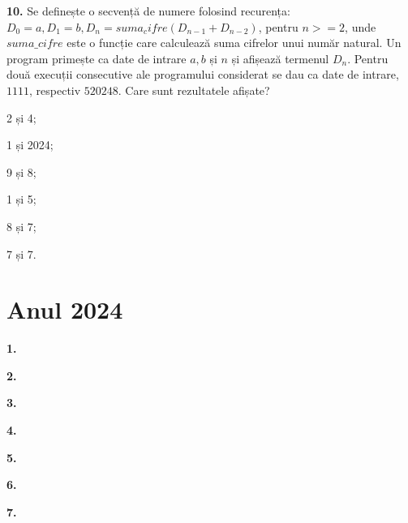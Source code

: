 \documentclass[11pt, a4paper]{article}
\begin{document}
\vspace{0.5cm}

\textbf{10.}\newline
Se definește o secvență de numere folosind recurența: $D_0=a, D_1=b, D_n=suma_cifre(D_{n-1}+D_{n-2})$, pentru $n>=2$, unde $suma\_cifre$ este o funcție care calculează suma cifrelor unui număr natural. Un program primește ca date de intrare $a, b$ și $n$ și afișează termenul $D_n$. Pentru două execuții consecutive ale programului considerat se dau ca date de intrare, $1 1 11$, respectiv $5 2024 8$. Care sunt rezultatele afișate?
\begin{inparaenum}
    \item 2 și 4;
    \item 1 și 2024;
    \item 9 și 8;
    \item 1 și 5;
    \item 8 și 7;
    \item 7 și 7.
\end{inparaenum}


\section{Anul 2024}
\textbf{1.}\newline


\vspace{0.5cm}

\textbf{2.}\newline


\vspace{0.5cm}

\textbf{3.}\newline


\vspace{0.5cm}

\textbf{4.}\newline


\vspace{0.5cm}

\textbf{5.}\newline


\vspace{0.5cm}

\textbf{6.}\newline


\vspace{0.5cm}

\textbf{7.}\newline


\vspace{0.5cm}
\end{document}
